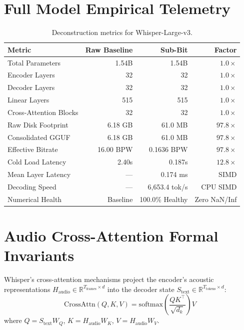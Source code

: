 \documentclass[10pt,twocolumn,letterpaper]{article}
\begin{document}
\section{Full Model Empirical Telemetry}
\begin{table}[h]
\centering
\small
\begin{tabular}{lrrr}
\toprule
\textbf{Metric} & \textbf{Raw Baseline} & \textbf{Sub-Bit} & \textbf{Factor} \\
\midrule
Total Parameters & 1.54B & 1.54B & $1.0\times$ \\
Encoder Layers & 32 & 32 & $1.0\times$ \\
Decoder Layers & 32 & 32 & $1.0\times$ \\
Linear Layers & 515 & 515 & $1.0\times$ \\
Cross-Attention Blocks & 32 & 32 & $1.0\times$ \\
Raw Disk Footprint & 6.18 GB & 61.0 MB & \textbf{$97.8\times$} \\
Consolidated GGUF & 6.18 GB & 61.0 MB & \textbf{$97.8\times$} \\
Effective Bitrate & 16.00 BPW & 0.1636 BPW & \textbf{$97.8\times$} \\
Cold Load Latency & 2.40s & 0.187s & \textbf{$12.8\times$} \\
Mean Layer Latency & --- & 0.174 ms & SIMD \\
Decoding Speed & --- & 6,653.4 tok/s & CPU SIMD \\
Numerical Health & Baseline & 100.0\% Healthy & Zero NaN/Inf \\
\bottomrule
\end{tabular}
\caption{Deconstruction metrics for Whisper-Large-v3.}
\end{table}

\section{Audio Cross-Attention Formal Invariants}
Whisper's cross-attention mechanisms project the encoder's acoustic representations $H_{\text{audio}} \in \mathbb{R}^{T_{\text{frames}} \times d}$ into the decoder state $S_{\text{text}} \in \mathbb{R}^{T_{\text{tokens}} \times d}$:
\begin{equation}
\text{CrossAttn}(Q, K, V) = \text{softmax}\left(\frac{Q K^\top}{\sqrt{d_k}}\right) V
\end{equation}
where $Q = S_{\text{text}} W_Q$, $K = H_{\text{audio}} W_K$, $V = H_{\text{audio}} W_V$.
\end{document}
